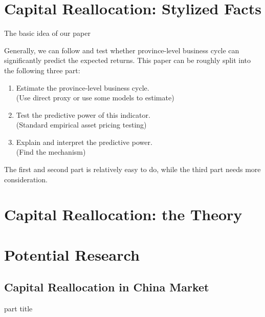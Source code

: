 \documentclass[11pt]{beamer}
\begin{document}
\begin{CJK*}{UTF8}{gkai}
\section{Capital Reallocation: Stylized Facts}
\begin{frame}
	\sectionpage
\end{frame}

\begin{frame}{The basic idea of our paper}
	
	Generally, we can follow \cite{korniotis2013state-level} and test whether province-level business cycle can significantly predict the expected returns.
	\vskip 0.25cm
	This paper can be roughly split into the following three part:
	\begin{enumerate}
		\item Estimate the province-level business cycle. \\(Use direct proxy or use some models to estimate)
		\item Test the predictive power of this indicator. \\(Standard empirical asset pricing testing)
		\item Explain and interpret the predictive power. \\(Find the mechanism)
	\end{enumerate}

\vskip 0.25cm

The first and second part is relatively easy to do, while the third part needs more consideration.
\end{frame}

\section{Capital Reallocation: the Theory}
\begin{frame}
	\sectionpage
\end{frame}

\section{Potential Research}
\begin{frame}
	\sectionpage
\end{frame}

\subsection{Capital Reallocation in China Market}
\begin{frame}
	\begin{centering}
		{\small \begin{beamercolorbox}[center]{part title}
			\insertsubsection\par
		\end{beamercolorbox}}
	\end{centering}
\end{frame}


\end{CJK*}
\end{document}
